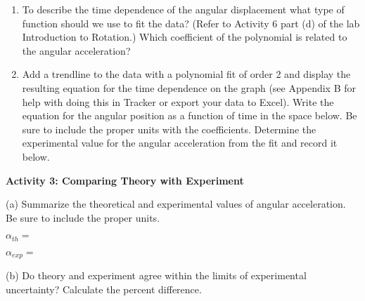 \begin{enumerate}
\item To describe the time dependence of the angular displacement what type of 
function should we use to fit the data? (Refer to Activity 6 part (d) of the lab Introduction to Rotation.) Which coefficient of the polynomial is related to 
the angular acceleration?
\answerspace{20mm}


\item Add a trendline to the data with a polynomial fit of order 2 and display the resulting equation for the time dependence on the graph (see Appendix B for help with doing this in Tracker or export your data to Excel). Write the equation for the angular position as a function of time in the space below. Be sure to include the proper units with the coefficients. Determine the experimental value for the angular acceleration from the fit and record it below. 
\vspace{20mm}

\end{enumerate}


\textbf{Activity 3: Comparing Theory with Experiment }

(a) Summarize the theoretical and experimental values of angular acceleration. 
Be sure to include the proper units.
\vspace{10mm}

\( \alpha _{th}= \)
\vspace{10mm}

\( \alpha _{exp}= \) 
\vspace{15mm}

(b) Do theory and experiment agree within the limits of experimental 
uncertainty? Calculate the percent difference.


